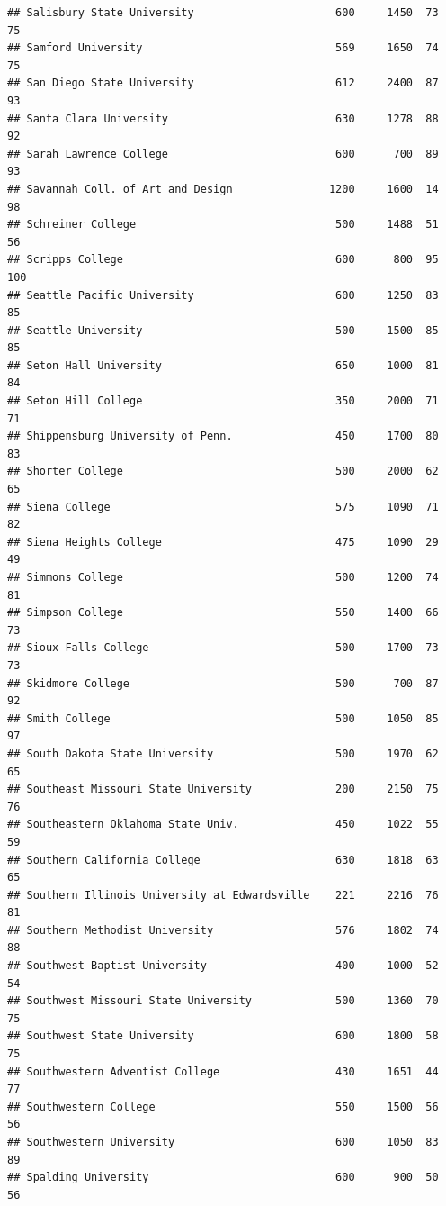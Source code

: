 \documentclass[
]{article}
\begin{document}
\begin{verbatim}
## Salisbury State University                      600     1450  73       75
## Samford University                              569     1650  74       75
## San Diego State University                      612     2400  87       93
## Santa Clara University                          630     1278  88       92
## Sarah Lawrence College                          600      700  89       93
## Savannah Coll. of Art and Design               1200     1600  14       98
## Schreiner College                               500     1488  51       56
## Scripps College                                 600      800  95      100
## Seattle Pacific University                      600     1250  83       85
## Seattle University                              500     1500  85       85
## Seton Hall University                           650     1000  81       84
## Seton Hill College                              350     2000  71       71
## Shippensburg University of Penn.                450     1700  80       83
## Shorter College                                 500     2000  62       65
## Siena College                                   575     1090  71       82
## Siena Heights College                           475     1090  29       49
## Simmons College                                 500     1200  74       81
## Simpson College                                 550     1400  66       73
## Sioux Falls College                             500     1700  73       73
## Skidmore College                                500      700  87       92
## Smith College                                   500     1050  85       97
## South Dakota State University                   500     1970  62       65
## Southeast Missouri State University             200     2150  75       76
## Southeastern Oklahoma State Univ.               450     1022  55       59
## Southern California College                     630     1818  63       65
## Southern Illinois University at Edwardsville    221     2216  76       81
## Southern Methodist University                   576     1802  74       88
## Southwest Baptist University                    400     1000  52       54
## Southwest Missouri State University             500     1360  70       75
## Southwest State University                      600     1800  58       75
## Southwestern Adventist College                  430     1651  44       77
## Southwestern College                            550     1500  56       56
## Southwestern University                         600     1050  83       89
## Spalding University                             600      900  50       56

\end{verbatim}
\end{document}
